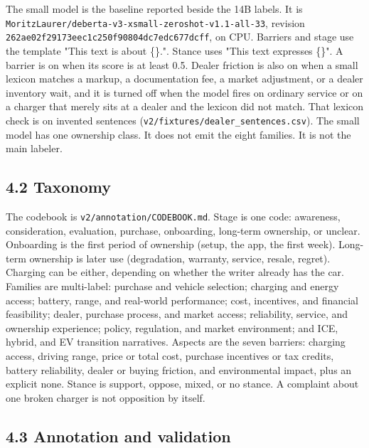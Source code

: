 \documentclass[11pt]{article}
\begin{document}
The small model is the baseline reported beside the 14B labels. It is \texttt{MoritzLaurer/deberta-v3-xsmall-zeroshot-v1.1-all-33}, revision \texttt{262ae02f29173eec1c250f90804dc7edc677dcff}, on CPU. Barriers and stage use the template "This text is about \{\}.". Stance uses "This text expresses \{\}". A barrier is on when its score is at least 0.5. Dealer friction is also on when a small lexicon matches a markup, a documentation fee, a market adjustment, or a dealer inventory wait, and it is turned off when the model fires on ordinary service or on a charger that merely sits at a dealer and the lexicon did not match. That lexicon check is on invented sentences (\texttt{v2/fixtures/dealer\_sentences.csv}). The small model has one ownership class. It does not emit the eight families. It is not the main labeler.


\subsection{4.2 Taxonomy}

The codebook is \texttt{v2/annotation/CODEBOOK.md}. Stage is one code: awareness, consideration, evaluation, purchase, onboarding, long-term ownership, or unclear. Onboarding is the first period of ownership (setup, the app, the first week). Long-term ownership is later use (degradation, warranty, service, resale, regret). Charging can be either, depending on whether the writer already has the car. Families are multi-label: purchase and vehicle selection; charging and energy access; battery, range, and real-world performance; cost, incentives, and financial feasibility; dealer, purchase process, and market access; reliability, service, and ownership experience; policy, regulation, and market environment; and ICE, hybrid, and EV transition narratives. Aspects are the seven barriers: charging access, driving range, price or total cost, purchase incentives or tax credits, battery reliability, dealer or buying friction, and environmental impact, plus an explicit none. Stance is support, oppose, mixed, or no stance. A complaint about one broken charger is not opposition by itself.


\subsection{4.3 Annotation and validation}
\end{document}
